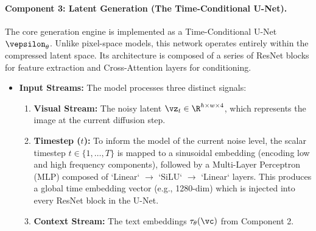 \documentclass[../../book-main.tex]{subfiles}
\begin{document}
\paragraph{Component 3: Latent Generation (The Time-Conditional U-Net).}
The core generation engine is implemented as a Time-Conditional U-Net \(\vepsilon_{\theta}\).
Unlike pixel-space models, this network operates entirely within the compressed latent space.
Its architecture is composed of a series of ResNet blocks for feature extraction and Cross-Attention layers for conditioning.
\begin{itemize}
    \item \textbf{Input Streams:} The model processes three distinct signals:
    \begin{enumerate}
        \item \textbf{Visual Stream:} The noisy latent \(\vz_{t} \in \R^{h \times w \times 4}\), which represents the image at the current diffusion step.
        \item \textbf{Timestep (\(t\)):} To inform the model of the current noise level, the scalar timestep \(t \in \{1, \dots, T\}\) is mapped to a sinusoidal embedding (encoding low and high frequency components), followed by a Multi-Layer Perceptron (MLP) composed of `Linear` $\to$ `SiLU` $\to$ `Linear` layers.
This produces a global time embedding vector (e.g., 1280-dim) which is injected into every ResNet block in the U-Net.
        \item \textbf{Context Stream:} The text embeddings \(\tau_{\theta}(\vc)\) from Component 2.
    \end{enumerate}


\end{itemize}
\end{document}
